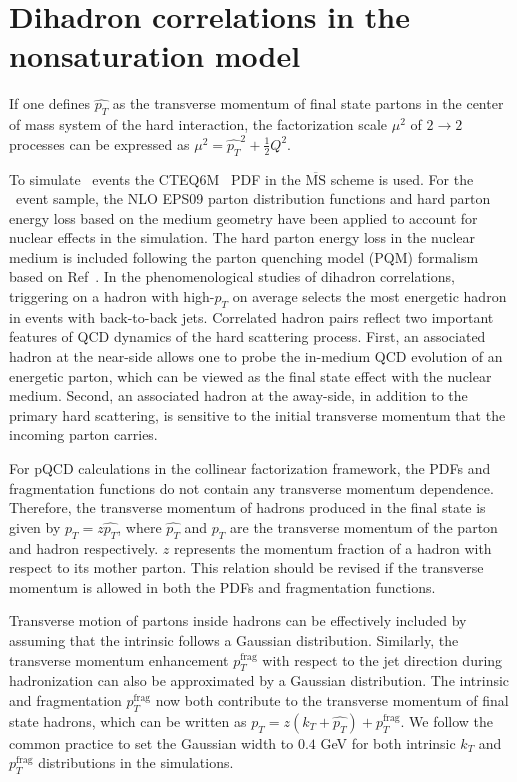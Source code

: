 \section{Dihadron correlations in the nonsaturation model} \label{sec:dihadron_nonsat_mc}

If one defines $\hat{p_{T}}$ as the transverse momentum
of final state partons in the center of mass system of the hard interaction, the
factorization scale $\mu^{2}$ of $2\rightarrow 2$ processes can be expressed
as $\mu^{2} = \hat{p_{T}}^{2} + \frac{1}{2}Q^{2}$.


To simulate \ep\ events the CTEQ6M~\cite{Pumplin:2002vw} PDF in the
$\overline{\textrm{MS}}$ scheme is used. For the \eA\ event sample, the NLO
EPS09 parton distribution functions \cite{Eskola:2009uj} and hard parton energy
loss based on the medium geometry have been applied to account for nuclear
effects in the simulation. 
The hard parton energy loss in the nuclear medium is included
following the parton quenching model (PQM) formalism based on
Ref~\cite{Salgado:2003gb}.
In the phenomenological studies of dihadron correlations, triggering on a hadron
with high-$p_T$ on average selects the most energetic hadron in events with 
back-to-back jets. Correlated hadron pairs reflect two important features of QCD 
dynamics of the hard scattering process.
First, an associated hadron at the near-side allows one to probe the in-medium
QCD evolution of an energetic parton, which can be viewed as the final state
effect with the nuclear medium. Second, an associated hadron at the away-side,
in addition to the primary hard scattering, is sensitive to the initial
transverse momentum that the incoming parton carries.

For pQCD calculations in the collinear factorization framework, the PDFs and fragmentation
functions do not contain any transverse momentum dependence. Therefore, the
transverse momentum of hadrons produced in the final state is given by
$p_{T}=z\hat{p_{T}}$, where $\hat{p_{T}}$ and $p_{T}$ are the transverse
momentum of the parton and hadron respectively. $z$ represents the momentum fraction
of a hadron with respect to its mother parton. This relation should be revised
if the transverse momentum is allowed in both the PDFs and fragmentation
functions.

Transverse motion of partons inside hadrons can be effectively included by
assuming that the intrinsic \kt follows a Gaussian distribution. Similarly, the
transverse momentum enhancement  $p_{T}^{\textrm{frag}}$ with respect to the jet
direction during hadronization can also be approximated by a Gaussian
distribution. The intrinsic \kt and fragmentation $p_{T}^{\textrm{frag}}$ now
both contribute to the transverse momentum of final state hadrons, which can be
written as $p_{T} =z(k_{T}+\hat{p_{T}})+p_{T}^{\textrm{frag}}$. We follow the
common practice to set the Gaussian width to $0.4$ GeV for both intrinsic $k_{T}$ 
and $p_{T}^{\textrm{frag}}$ distributions in the simulations.

